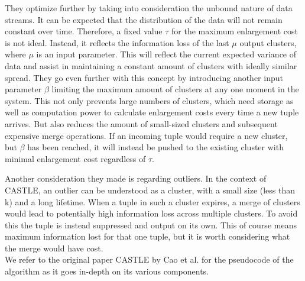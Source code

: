 They optimize further by taking into consideration the unbound nature of data streams. It can be expected that the distribution of the data will not remain constant over time. Therefore, a fixed value $\tau$ for the maximum enlargement cost is not ideal. Instead, it reflects the information loss of the last $\mu$ output clusters, where $\mu$ is an input parameter. This will reflect the current expected variance of data and assist in maintaining a constant amount of clusters with ideally similar spread. They go even further with this concept by introducing another input parameter $\beta$ limiting the maximum amount of clusters at any one moment in the system. This not only prevents large numbers of clusters, which need storage as well as computation power to calculate enlargement costs every time a new tuple arrives. But also reduces the amount of small-sized clusters and subsequent expensive merge operations. If an incoming tuple would require a new cluster, but $\beta$ has been reached, it will instead be pushed to the existing cluster with minimal enlargement cost regardless of $\tau$. \par

Another consideration they made is regarding outliers. In the context of CASTLE, an outlier can be understood as a cluster, with a small size (less than k) and a long lifetime. When a tuple in such a cluster expires, a merge of clusters would lead to potentially high information loss across multiple clusters. To avoid this the tuple is instead suppressed and output on its own. This of course means maximum information lost for that one tuple, but it is worth considering what the merge would have cost. \\ 
We refer to the original paper CASTLE by Cao et al. \cite{Cao2008} for the pseudocode of the algorithm as it goes in-depth on its various components.



